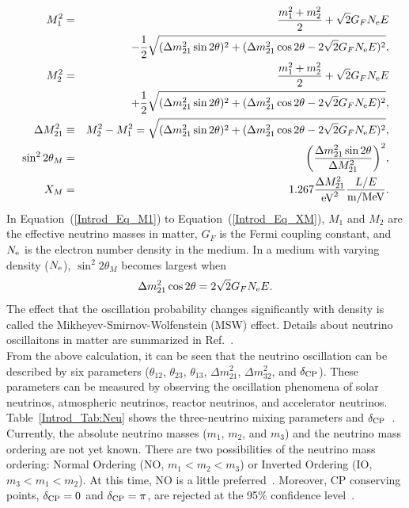 \begin{eqnarray}
	M_{1}^{2}           &=&      {m_{1}^{2} + m_{2}^{2} \over 2} + \sqrt{2}G_{F}N_{\rm e}E \label{Introd_Eq_M1} \nonumber \\
	                    & &      - {1 \over 2}\sqrt{(\Delta m_{21}^{2}\sin2\theta)^{2} + (\Delta m_{21}^{2}\cos2\theta - 2\sqrt{2}G_{F}N_{\rm e}E)^{2}}, \\
	M_{2}^{2}           &=&      {m_{1}^{2} + m_{2}^{2} \over 2} + \sqrt{2}G_{F}N_{\rm e}E \nonumber \\
	                    & &      + {1 \over 2}\sqrt{(\Delta m_{21}^{2}\sin2\theta)^{2} + (\Delta m_{21}^{2}\cos2\theta - 2\sqrt{2}G_{F}N_{\rm e}E)^{2}}, \\
	\Delta M_{21}^{2}   &\equiv& M_{2}^{2}-M_{1}^{2} = \sqrt{(\Delta m_{21}^{2}\sin2\theta)^{2} + (\Delta m_{21}^{2}\cos2\theta - 2\sqrt{2}G_{F}N_{\rm e}E)^{2}}, \\
	\sin^{2}2\theta_{M} &=&      \bigg({\Delta m_{21}^{2}\sin2\theta \over \Delta M_{21}^{2}}\bigg)^{2}, \\
	X_{M}               &=&      1.267{\Delta M_{21}^{2} \over {\rm eV}^{2}}{L/E \over {\rm m}/{\rm MeV}}. \label{Introd_Eq_XM}
\end{eqnarray}
In Equation~(\ref{Introd_Eq_M1}) to Equation~(\ref{Introd_Eq_XM}), $M_{1}$ and $M_{2}$ are the effective neutrino masses in matter, $G_{F}$ is the Fermi coupling constant, and $N_{\rm e}$ is the electron number density in the medium.
In a medium with varying density ($N_{\rm e}$), $\sin^{2}2\theta_{M}$ becomes largest when
\begin{eqnarray}
	\Delta m_{21}^{2}\cos2\theta = 2\sqrt{2}G_{F}N_{\rm e}E.
\end{eqnarray}
The effect that the oscillation probability changes significantly with density is called the Mikheyev-Smirnov-Wolfenstein (MSW) effect.
Details about neutrino oscillaitons in matter are summarized in Ref.~\cite{1989Kuo,2022Workman}.\\
\hs
From the above calculation, it can be seen that the neutrino oscillation can be described by six parameters ($\theta_{12}$, $\theta_{23}$, $\theta_{13}$, $\Delta m_{21}^{2}$, $\Delta m_{32}^{2}$, and $\delta_{{\rm CP}}$).
These parameters can be measured by observing the oscillation phenomena of solar neutrinos, atmospheric neutrinos, reactor neutrinos, and accelerator neutrinos.
Table~\ref{Introd_Tab:Neu} shows the three-neutrino mixing parameters and $\delta_{{\rm CP}}$~\cite{PDG}.
Currently, the absolute neutrino masses ($m_{1}$, $m_{2}$, and $m_{3}$) and the neutrino mass ordering are not yet known.
There are two possibilities of the neutrino mass ordering: Normal Ordering (NO, $m_{1}<m_{2}<m_{3}$) or Inverted Ordering (IO, $m_{3}<m_{1}<m_{2}$).
At this time, NO is a little preferred~\cite{2017Abe}.
Moreover, CP conserving points, $\delta_{\rm CP} = 0$ and $\delta_{\rm CP} = \pi$, are rejected at the 95\% confidence level~\cite{2020Abe}.

